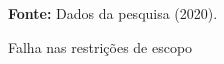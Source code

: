 \begin{figure}[ht!]
\centering

\caption{\textmd{Falha nas restrições de escopo}}
\label{fig:falha}

\par\medskip\textbf{Fonte:} Dados da pesquisa (2020). \par\medskip

\end{figure}

